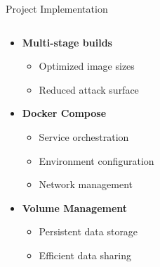 \documentclass[notes]{beamer}
\begin{document}
\begin{frame}[fragile]{Project Implementation}
    \begin{columns}[T]
        \begin{column}{0.5\textwidth}
            \vspace{1cm}  %
            \begin{itemize}
                \item \textbf{Multi-stage builds}
                \begin{itemize}\small
                    \item Optimized image sizes
                    \item Reduced attack surface
                \end{itemize}
                \vspace{0.4cm}
                
                \item \textbf{Docker Compose}
                \begin{itemize}\small
                    \item Service orchestration
                    \item Environment configuration
                    \item Network management
                \end{itemize}
                \vspace{0.4cm}
                
                \item \textbf{Volume Management}
                \begin{itemize}\small
                    \item Persistent data storage
                    \item Efficient data sharing
                \end{itemize}
            \end{itemize}
        \end{column}
        

\end{columns}
\end{frame}
\end{document}
